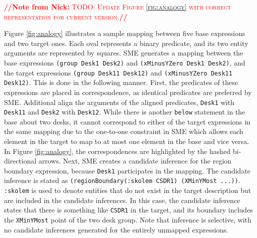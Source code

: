 \documentclass[letterpaper]{article}
\newcommand{\from}[2]{\textcolor{red}{\noindent\textbf{//}\textbf{Note
      from #1:}\textsc{ #2}\textbf{//}}}
\newcommand{\fw}[1]{\texttt{#1}}
\begin{document}
\from{Nick}{TODO: Update Figure \ref{fig:analogy} with correct representation for current version.}

Figure \ref{fig:analogy} illustrates a sample mapping between five base expressions and two target ones. Each oval represents a binary predicate, and its two entity arguments are represented by squares. SME generates a mapping between the base expressions \fw{(group Desk1 Desk2)} and \fw{(xMinusYZero Desk1 Desk2)}, and the  target expressions \fw{(group Desk11 Desk12)} and \fw{(xMinusYZero Desk11 Desk12)}. This is done in the following manner. First, the predicates of these expressions are placed in correspondence, as identical predicates are preferred by SME. Additional align the arguments of the aligned predicates, \fw{Desk1} with \fw{Desk11} and \fw{Desk2} with \fw{Desk12}. While there is another \fw{below} statement in the base about two desks, it cannot correspond to either of the target expressions in the same mapping due to the one-to-one constraint in SME which allows each element in the target to map to at most one element in the base and vice versa. In Figure \ref{fig:analogy}, the correspondences are highlighted by the hashed bi-directional arrows. Next, SME creates a candidate inference for the region boundary expression, because \fw{Desk1} participates in the mapping. The candidate inference is stated as \fw{(regionBoundary(:skolem CSDR1) (XMinYMost ...))}. \fw{:skolem} is used to denote entities that do not exist in the target description but are included in the candidate inferences. In this case, the candidate inference states that there is something like \fw{CSDR1} in the target, and its boundary includes the \fw{XMinYMost} point of the two desk group. Note that inference is selective, with no candidate inferences generated for the entirely unmapped expressions. %
 
\end{document}
